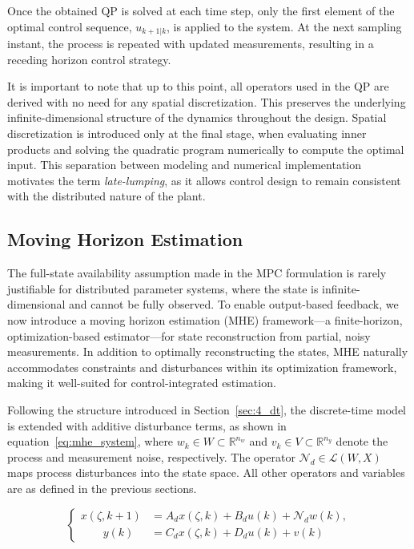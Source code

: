 Once the obtained QP is solved at each time step, only the first element of the optimal control sequence, $u_{k+1|k}$, is applied to the system. At the next sampling instant, the process is repeated with updated measurements, resulting in a receding horizon control strategy.

It is important to note that up to this point, all operators used in the QP are derived with no need for any spatial discretization. This preserves the underlying infinite-dimensional structure of the dynamics throughout the design. Spatial discretization is introduced only at the final stage, when evaluating inner products and solving the quadratic program numerically to compute the optimal input. This separation between modeling and numerical implementation motivates the term \emph{late-lumping}, as it allows control design to remain consistent with the distributed nature of the plant.


\subsection{Moving Horizon Estimation} \label{sec:mhe}

The full-state availability assumption made in the MPC formulation is rarely justifiable for distributed parameter systems, where the state is infinite-dimensional and cannot be fully observed. To enable output-based feedback, we now introduce a moving horizon estimation (MHE) framework---a finite-horizon, optimization-based estimator---for state reconstruction from partial, noisy measurements. In addition to optimally reconstructing the states, MHE naturally accommodates constraints and disturbances within its optimization framework, making it well-suited for control-integrated estimation.

Following the structure introduced in Section~\ref{sec:4_dt}, the discrete-time model is extended with additive disturbance terms, as shown in equation~\eqref{eq:mhe_system}, where $w_k \in W \subset \mathbb{R}^{n_w}$ and $v_k \in V \subset \mathbb{R}^{n_y}$ denote the process and measurement noise, respectively. The operator $\mathcal{N}_d \in \mathcal{L}(W, X)$ maps process disturbances into the state space. All other operators and variables are as defined in the previous sections.

\begin{equation} \label{eq:mhe_system}
\begin{cases}
x(\zeta, k{+}1) &= A_d x(\zeta, k) + B_d u(k) + \mathcal{N}_d w(k), \\
\qquad y(k) &= C_d x(\zeta, k) + D_d u(k) + v(k)
\end{cases}
\end{equation}

